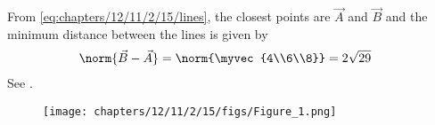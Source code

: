 From \eqref{eq:chapters/12/11/2/15/lines}, 
the closest points are $\vec{A}$  and $\vec{B}$ and  
the minimum distance between the lines is given by
\begin{align}
\norm{\vec{B}-\vec{A}} &= \norm{\myvec{4\\6\\8}}
= 2\sqrt{29}
\end{align}
%
See .
\begin{figure}[H]
\centering
\texttt{[image: chapters/12/11/2/15/figs/Figure\_1.png]}
\caption{}
\label{fig:chapters/12/11/2/15/}
\end{figure}

